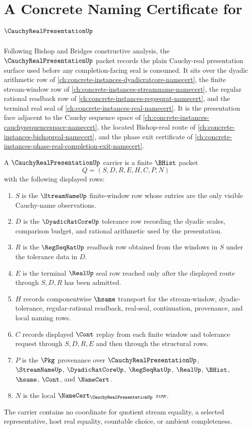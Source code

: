 \chapter{A Concrete Naming Certificate for $\CauchyRealPresentationUp$}
\label{ch:concrete-instances-cauchy-real-presentation-namecert}

Following Bishop and Bridges constructive analysis, the $\CauchyRealPresentationUp$ packet records the plain Cauchy-real presentation surface used before any completion-facing seal is consumed. It sits over the dyadic arithmetic row of \autoref{ch:concrete-instances-dyadicratcore-namecert}, the finite stream-window row of \autoref{ch:concrete-instances-streamname-namecert}, the regular rational readback row of \autoref{ch:concrete-instances-regseqrat-namecert}, and the terminal real seal of \autoref{ch:concrete-instances-real-namecert}. It is the presentation face adjacent to the Cauchy sequence space of \autoref{ch:concrete-instances-cauchysequencespace-namecert}, the located Bishop-real route of \autoref{ch:concrete-instances-bishopreal-namecert}, and the phase exit certificate of \autoref{ch:concrete-instances-phase-real-completion-exit-namecert}.

\begin{definition}
\label{def:cauchy-real-presentation-carrier}
A $\CauchyRealPresentationUp$ carrier is a finite $\BHist$ packet
$$
Q=(S,D,R,E,H,C,P,N)
$$
with the following displayed rows:
\begin{enumerate}
\item $S$ is the $\StreamNameUp$ finite-window row whose entries are the only visible Cauchy-name observations.
\item $D$ is the $\DyadicRatCoreUp$ tolerance row recording the dyadic scales, comparison budget, and rational arithmetic used by the presentation.
\item $R$ is the $\RegSeqRatUp$ readback row obtained from the windows in $S$ under the tolerance data in $D$.
\item $E$ is the terminal $\RealUp$ seal row reached only after the displayed route through $S,D,R$ has been admitted.
\item $H$ records componentwise $\hsame$ transport for the stream-window, dyadic-tolerance, regular-rational readback, real-seal, continuation, provenance, and local naming rows.
\item $C$ records displayed $\Cont$ replay from each finite window and tolerance request through $S,D,R,E$ and then through the structural rows.
\item $P$ is the $\Pkg$ provenance over $\CauchyRealPresentationUp$, $\StreamNameUp$, $\DyadicRatCoreUp$, $\RegSeqRatUp$, $\RealUp$, $\BHist$, $\hsame$, $\Cont$, and $\NameCert$.
\item $N$ is the local $\NameCert_{\CauchyRealPresentationUp}$ row.
\end{enumerate}
The carrier contains no coordinate for quotient stream equality, a selected representative, host real equality, countable choice, or ambient completeness.
\end{definition}

